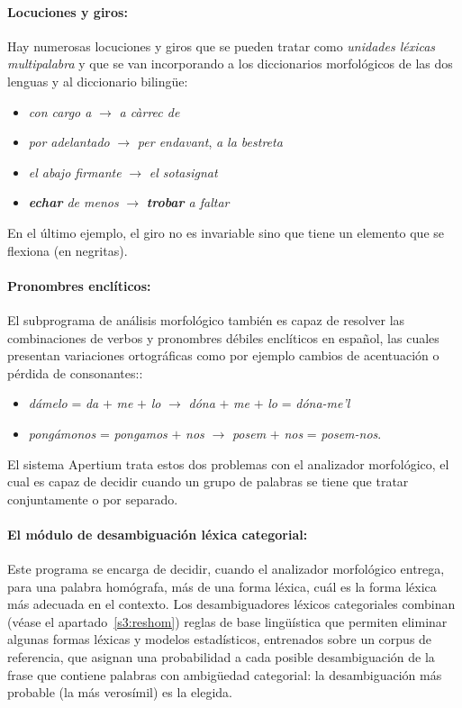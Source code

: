 \paragraph{Locuciones y giros:} Hay numerosas locuciones y giros que se pueden tratar como \emph{unidades léxicas multipalabra} y que se van incorporando a los diccionarios morfológicos de las dos lenguas y al diccionario bilingüe: \begin{itemize} \item \emph{con cargo a} $\rightarrow$ \emph{a càrrec de} \item \emph{por adelantado} $\rightarrow$ \emph{per endavant}, \emph{a la bestreta} \item \emph{el abajo firmante} $\rightarrow$ \emph{el sotasignat} \item \emph{{\bf echar} de menos} $\rightarrow$ \emph{{\bf trobar} a faltar} \end{itemize} En el último ejemplo, el giro no es invariable sino que tiene un elemento que se flexiona (en negritas). 

\paragraph{Pronombres enclíticos:} El subprograma de análisis morfológico también es capaz de resolver las combinaciones de verbos y pronombres débiles enclíticos en español, las cuales presentan variaciones ortográficas como por ejemplo cambios de acentuación o pérdida de consonantes:: \begin{itemize} \item \emph{d\'{a}melo} = \emph{da} $+$ \emph{me} $+$ \emph{lo} $\rightarrow$ \emph{dóna} $+$ \emph{me} $+$ \emph{lo} = \emph{dóna-me'l} \item \emph{pong\'{a}monos} = \emph{pongamos} $+$ \emph{nos} $\rightarrow$ {\em posem} $+$ \emph{nos} = \emph{posem-nos}. \end{itemize} 

El sistema Apertium trata estos dos problemas con el analizador morfológico, el cual es capaz de decidir cuando un grupo de palabras se tiene que tratar conjuntamente o por separado. 

\paragraph{El módulo de desambiguación léxica categorial:} Este programa se encarga de decidir, cuando el analizador morfológico entrega, para una palabra homógrafa, más de una forma léxica, cuál es la forma léxica más adecuada en el contexto. Los desambiguadores léxicos categoriales combinan (véase el apartado~\ref{s3:reshom}) reglas de base lingüística que permiten eliminar algunas formas léxicas y modelos estadísticos, entrenados sobre un corpus de referencia, que asignan una probabilidad a cada posible desambiguación de la frase que contiene palabras con ambigüedad categorial: la desambiguación más probable (la más verosímil) es la elegida. 

